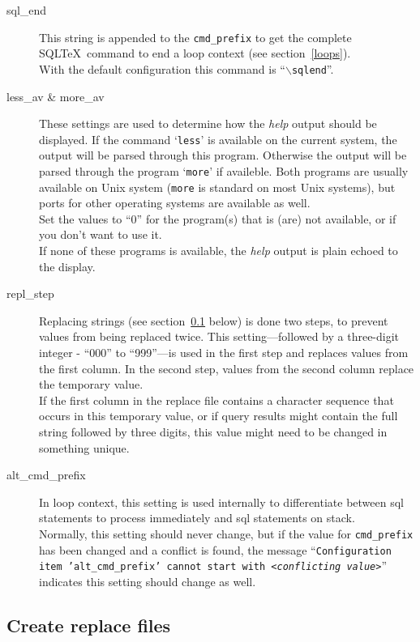 \documentclass{article}
\newcommand{\bs}{\ensuremath{\backslash}}
\begin{document}
\begin{description}
\item[sql\_end] This string is appended to the \texttt{cmd\_prefix} to get the complete SQL\TeX\ command to end a loop context (see section~\ref{loops}).\\
With the default configuration this command is ``\texttt{\bs sqlend}''.

\item[less\_av \& more\_av] These settings are used to determine how the \textsl{help} output should be displayed. If the command `\texttt{less}' is available on the current system, the output will be parsed through this program. Otherwise the output will be parsed through the program `\texttt{more}' if availeble. Both programs are usually available on Unix system (\texttt{more} is standard on most Unix systems), but ports for other
operating systems are available as well.\\
Set the values to ``0'' for the program(s) that is (are) not available, or if you don't want to use it.\\
If none of these programs is available, the \textsl{help} output is plain echoed to the display.

\item[repl\_step] Replacing strings (see section~\ref{replfiles} below) is done two steps, to prevent values from being replaced twice.
This setting---followed by a three-digit integer - ``000'' to ``999''---is used in the first step and replaces values from the first column.
In the second step, values from the second column replace the temporary value. \\
If the first column in the replace file contains a character sequence that occurs in this temporary value, or if query results might contain the full string followed by three digits, this value might need to be changed in something unique.

\item[alt\_cmd\_prefix] In loop context, this setting is used internally to differentiate between sql statements to process immediately and sql statements on stack.\\
Normally, this setting should never change, but if the value for \texttt{cmd\_prefix} has been changed and a conflict is found, the message ``\texttt{Configuration item 'alt\_cmd\_prefix' cannot start with \textit{<conflicting value>}}'' indicates this setting should change as well.

\end{description}

\subsection{Create replace files}\label{replfiles}
\end{document}
